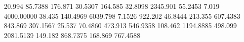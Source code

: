 


20.994   85.7388    %
176.871  30.5307    %
164.585  32.8098    %
2345.901 55.2453    %
7.019    4000.00000 %
38.435   140.4969   %
6039.798 7.1526     %
922.202  46.8444    %
213.355  607.4383   %
843.869  307.1567   %
25.537   70.4860    %
473.913  546.9358   %
108.462  1194.8885  %
498.099  2081.5139  %
149.182  868.7375   %
168.869  767.4588   %

